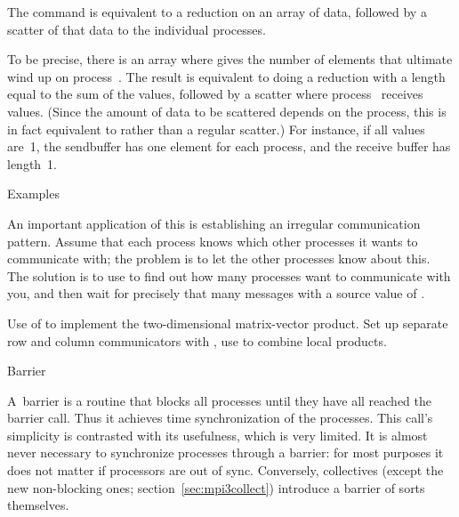 The  command is equivalent to a reduction
on an array of data, followed by a scatter of that data to the individual processes.

To be precise, there is an array  where  gives
the number of elements that ultimate wind up on process~.
The result is equivalent to doing a reduction with a length equal to the sum
of the  values, followed by a scatter where process~
receives  values. (Since the amount of data to be scattered
depends on the process, this is in fact equivalent to 
rather than a regular scatter.)
%
%
For instance, if all  values are~1, the sendbuffer has one element
for each process, and the receive buffer has length~1.

 {Examples}

An important application of this is establishing an irregular
communication pattern.  Assume that each process knows which
other processes it wants to communicate with; the problem is to
let the other processes know about this.
The solution is to use  to find out how many processes
want to communicate with you, and then wait for precisely that many messages
with a source value of .

Use of  to implement the two-dimensional
matrix-vector product.
Set up separate row and column communicators with
, use  to combine
local products.
%

 {Barrier}
\label{sec:barrier}

A~barrier is a
routine that blocks all processes until they have all reached the barrier
call. Thus it achieves time synchronization of the processes.
%
%
This call's simplicity is contrasted with its usefulness, which
is very limited. It is almost never necessary to synchronize processes
through a barrier: for most purposes it does not matter if processors
are out of sync. Conversely, collectives (except the new non-blocking
ones; section~\ref{sec:mpi3collect}) introduce a barrier of sorts themselves.

